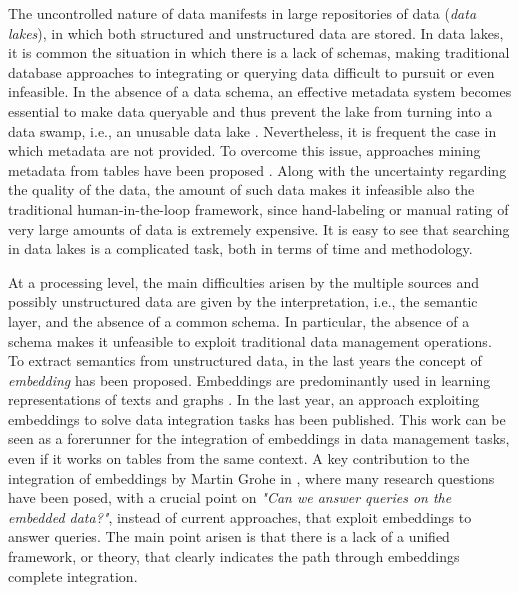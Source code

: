The uncontrolled nature of data manifests in large repositories of data (\textit{data lakes}), in which both structured and unstructured data are stored. In data lakes, it is common the situation in which there is a lack of schemas, making traditional database approaches to integrating or querying data difficult to pursuit or even infeasible. In the absence of a data schema, an effective metadata system becomes essential to make data queryable and thus prevent the lake from turning into a data swamp, i.e., an unusable data lake \cite{walker2015personal,hai2016constance}. Nevertheless, it is frequent the case in which metadata are not provided. To overcome this issue, approaches mining metadata from tables have been proposed \cite{arocena2015ibench,suriarachchi2016crossing}.
Along with the uncertainty regarding the quality of the data, the amount of such data makes it infeasible also the traditional human-in-the-loop framework, since hand-labeling or manual rating of very large amounts of data is extremely expensive. It is easy to see that searching in data lakes is a complicated task, both in terms of time and methodology. 

At a processing level, the main difficulties arisen by the multiple sources and possibly unstructured data are given by the interpretation, i.e., the semantic layer, and the absence of a common schema. In particular, the absence of a schema makes it unfeasible to exploit traditional data management operations. To extract semantics from unstructured data, in the last years the concept of \textit{embedding} has been proposed. Embeddings are predominantly used in learning representations of texts \cite{Mikolov2013EfficientEO} and graphs \cite{NIPS2017_7213}. In the last year, an approach exploiting embeddings to solve data integration tasks \cite{cappuzzo2020creating} has been published. This work can be seen as a forerunner for the integration of embeddings in data management tasks, even if it works on tables from the same context. A key contribution to the integration of embeddings by Martin Grohe in \cite{grohe2020word2vec}, where many research questions have been posed, with a crucial point on \textit{"Can we answer queries on the embedded data?"}, instead of current approaches, that exploit embeddings to answer queries. The main point arisen is that there is a lack of a unified framework, or theory, that clearly indicates the path through embeddings complete integration. 


